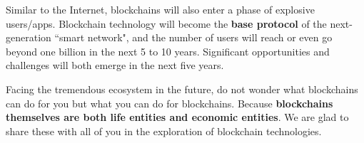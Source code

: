 Similar to the Internet, blockchains will also enter a phase of explosive users/apps. Blockchain technology will become the \textbf{base protocol} of the next-generation ``smart network", and the number of users will reach or even go beyond one billion in the next 5 to 10 years. Significant opportunities and challenges will both emerge in the next five years.


Facing the tremendous ecosystem in the future, do not wonder what blockchains can do for you but what you can do for blockchains. Because \textbf{blockchains themselves are both life entities and economic entities}. We are glad to share these with all of you in the exploration of blockchain technologies.

